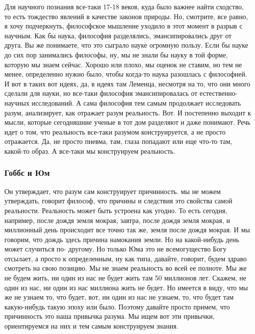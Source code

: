 Для научного познания все-таки 17-18 веков, куда было важнее найти сходство, то
есть тождество явлений в качестве законов природы. Но, смотрите, все равно, я
хочу подчеркнуть, философское мышление уходило в этот момент в разрыв с научным.
Как бы наука, философия разделялись, эмансипировались друг от друга. Вы же
понимаете, что это сыграло науке огромную пользу. Если бы науке до сих пор
занимались философы, ну, мы не знали бы науку в той форме, которую мы знаем
сейчас. Хорошо или плохо, мы оценок не ставим, но тем не менее, определенно
нужно было, чтобы когда-то наука разошлась с философией. И вот в таких вот
идеях, да, в идеях там Леменца, несмотря на то, что они много сделали для науки,
но все-таки философия эмансипировалась от естественно-научных исследований. А
сама философия тем самым продолжает исследовать разум, анализирует, как отражает
разум реальность. Вот. И постепенно выходит к мысли, которые сегодняшние ученые
в тот дом разделяют и даже понимают. Речь идет о том, что реальность все-таки
разумом конструируется, а не просто отражается. Да, не просто пневма, там, глаза
попадают или еще что-то там, какой-то образ. А все-таки мы конструируем
реальность. 



\subsubsection{Гоббс и Юм}
Он утверждает, что разум сам конструирует причинность. мы не можем утверждать,
говорит философ, что причины и следствия это свойства самой реальности.
Реальность может быть устроена как угодно. То есть сегодня, например, после
дождя земля мокрая, завтра, после дождя земля мокрая, и миллионный день
происходит все точно так же, земля после дождя мокрая. И мы говорим, что дождь
здесь причина намокания земли. Но на какой-нибудь день может случиться по-
другому. Но только Юма это не всемогущество Богу отсылает, а просто к
определенным, ну как типа, давайте, говорит, будем здраво смотреть на свою
позицию. Мы не знаем реальность во всей ее полноте. Мы же не будем жить, ни один
из нас не будет жить там 50 миллионов лет. Скажем, не один из нас, ни один из
нас миллиона жить не будет. Но имеется в виду, что мы же не узнаем то, что
будет, вот, ни один из нас не узнаем, то, что будет там какую-нибудь такую эпоху
или было. Поэтому давайте просто примем, что причинность это наша привычка
разума. Мы ищем вот эти привычки, ориентируемся на них и тем самым конструируем
знания. 

